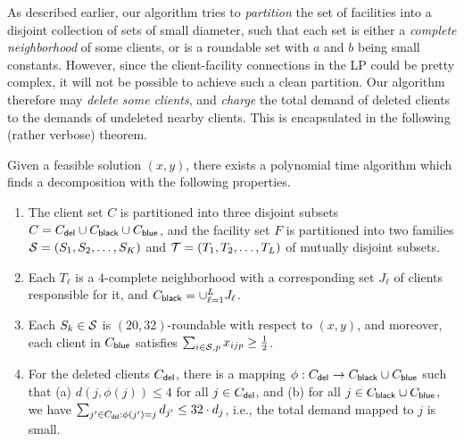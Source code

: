\medskip \noindent
As described earlier, our algorithm tries to \emph{partition} the set of facilities into a disjoint collection of sets of small diameter, such that each set is either a \emph{complete neighborhood} of some clients, or is a roundable set with $a$ and $b$ being small constants.
However, since the client-facility connections in the LP could be pretty complex, it will not be possible to achieve such a clean partition. Our algorithm therefore may \emph{delete some clients}, and \emph{charge} the total demand of deleted clients to the demands of undeleted nearby clients.
This is encapsulated in the following (rather verbose) theorem. 

\begin{theorem}\label{thm:decomp}
	Given a feasible solution $(x,y)$, there exists a polynomial time algorithm which finds a decomposition with the following properties.
	\begin{enumerate}%
		\item The client set $C$ is partitioned into three disjoint subsets $C = C_{\mathsf{del}} \cup C_{\mathsf{black}} \cup C_{\mathsf{blue}}$, and the facility set $F$ is partitioned into two families ${\cal S} = (S_1, S_2, \ldots, S_K)$ and ${\cal T} = (T_1, T_2, \ldots, T_L)$ of mutually disjoint subsets.

\item Each $T_\ell$ is a $4$-complete neighborhood with a corresponding set $J_\ell$ of clients responsible for it, and $C_{\mathsf{black}} = \cup_{\ell = 1}^L J_\ell$.	

		\item Each $S_k \in {\cal S}$ is $(20,32)$-roundable with respect to $(x,y)$, and moreover, each client in $C_{\mathsf{blue}}$ satisfies $\sum_{i \in {\cal S}, p} x_{ijp} \geq \frac12$.

\item For the deleted clients $C_{\mathsf{del}}$, there is a mapping $\phi:C_{\mathsf{del}} \to C_{\mathsf{black}} \cup C_{\mathsf{blue}}$ such that
(a) $d(j,\phi(j)) \leq 4$ for all $j\in C_{\mathsf{del}}$, and
(b)	for all $j\in C_{\mathsf{black}} \cup C_{\mathsf{blue}}$, we have $\sum_{j' \in C_{\mathsf{del}}: \phi(j') = j} d_{j'} \leq 32\cdot d_j$, i.e., the total demand mapped to $j$ is small.

\end{enumerate}
\end{theorem}

